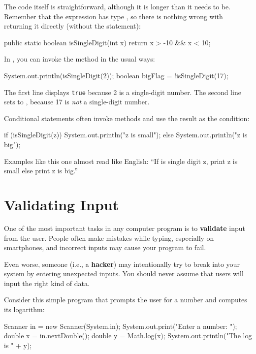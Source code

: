 The code itself is straightforward, although it is longer than it needs to be.
Remember that the expression  has type , so there is nothing wrong with returning it directly (without the  statement):

\begin{code}
public static boolean isSingleDigit(int x) {
    return x > -10 && x < 10;
}
\end{code}

In , you can invoke the method in the usual ways:

\begin{code}
System.out.println(isSingleDigit(2));
boolean bigFlag = !isSingleDigit(17);
\end{code}

The first line displays {\tt true} because 2 is a single-digit number.
The second line sets  to , because 17 is {\em not} a single-digit number.

Conditional statements often invoke  methods and use the result as the condition:

\begin{code}
if (isSingleDigit(z)) {
    System.out.println("z is small");
} else {
    System.out.println("z is big");
}
\end{code}

Examples like this one almost read like English:
``If is single digit z, print z is small else print z is big.''


\section{Validating Input}
\label{validate}


One of the most important tasks in any computer program is to {\bf validate} input from the user.
People often make mistakes while typing, especially on smartphones, and incorrect inputs may cause your program to fail.

Even worse, someone (i.e., a {\bf hacker}) may intentionally try to break into your system by entering unexpected inputs.
You should never assume that users will input the right kind of data.

Consider this simple program that prompts the user for a number and computes its logarithm:

\begin{code}
Scanner in = new Scanner(System.in);
System.out.print("Enter a number: ");
double x = in.nextDouble();
double y = Math.log(x);
System.out.println("The log is " + y);
\end{code}

